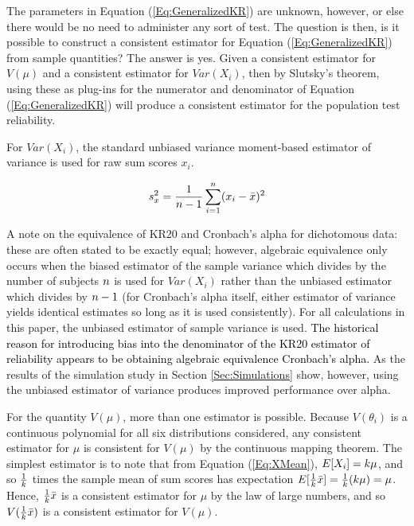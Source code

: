 \documentclass[12pt,epsfig]{article}
\newcommand{\changed}[1]{\textcolor{black}{#1}}
\newcommand{\numsubjects}{\changed{n}}%
\newcommand{\testlength}{\changed{k}}%
\begin{document}
The parameters in Equation (\ref{Eq:GeneralizedKR}) are unknown, however, or else there would be no need to administer any sort of test. The question is then, is it possible to construct a consistent estimator for  Equation (\ref{Eq:GeneralizedKR}) from sample quantities? The answer is yes. Given a consistent estimator for $V(\mu)$ and a consistent estimator for $Var(X_i)$, then by Slutsky's theorem, using these as plug-ins for the numerator and denominator of Equation (\ref{Eq:GeneralizedKR}) will produce a consistent estimator for the population test reliability.


For $Var(X_i)$, the standard unbiased variance moment-based estimator of variance is used for raw sum scores $x_i$.

\begin{equation*}
s^2_x = \dfrac{1}{\numsubjects-1} \sum_{i = 1}^{\numsubjects} (x_i - \bar{x})^2
\end{equation*}

\noindent A note on the equivalence of KR20 and Cronbach's alpha for dichotomous data: these are often stated to be exactly equal; however, algebraic equivalence only occurs when the biased estimator of the sample variance which divides by the number of subjects $\numsubjects$ is used for $Var(X_i)$ rather than the unbiased estimator which divides by $\numsubjects-1$ (for Cronbach's alpha itself, either estimator of variance yields identical estimates so long as it is used consistently). For all calculations in this paper, the unbiased estimator of sample variance is used. \changed{The historical reason for introducing bias into the denominator of the KR20 estimator of reliability appears to be obtaining algebraic equivalence Cronbach's alpha.}  As the results of the simulation study in Section \ref{Sec:Simulations} show, however, using the unbiased estimator of variance produces improved performance over alpha.


 For the quantity $V(\mu)$, more than one estimator is possible. Because $V(\theta_i)$ is a continuous polynomial for all six distributions considered, any consistent estimator for $\mu$ is consistent for $V(\mu)$ by the continuous mapping theorem. The simplest estimator is to note that from Equation (\ref{Eq:XMean}), $E[X_i] = \testlength \mu$, and so $\frac{1}{\testlength}$ times the sample mean of sum scores has expectation $E[\frac{1}{\testlength} \bar{x}] = \frac{1}{\testlength} (\testlength \mu) = \mu$. Hence, $\frac{1}{\testlength} \bar{x}$ is a consistent estimator for $\mu$ by the law of large numbers, and so $V(\frac{1}{\testlength} \bar{x})$ is a consistent estimator for $V(\mu)$.
\end{document}
